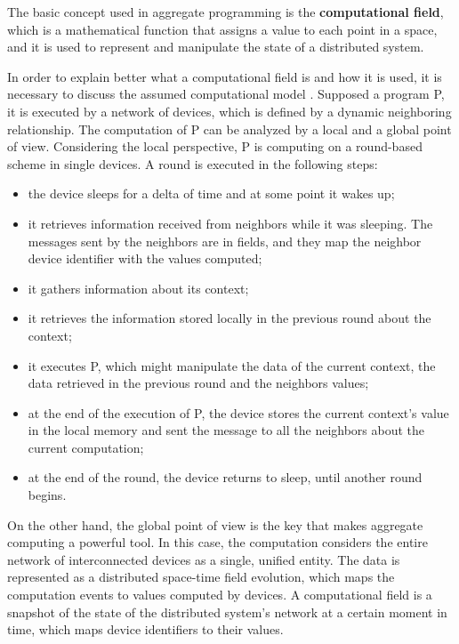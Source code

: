 The basic concept used in aggregate programming is the \textbf{computational field}, which is a mathematical function that assigns a value to each point in a space, and it is used to represent and manipulate the state of a distributed system.

In order to explain better what a computational field is and how it is used, it is necessary to discuss the assumed computational model \cite{computational_fields_theory}.\newline
Supposed a program P, it is executed by a network of devices, which is defined by a dynamic neighboring relationship. The computation of P can be analyzed by a local and a global point of view.\newline
Considering the local perspective, P is computing on a round-based scheme in single devices. A round is executed in the following steps:
\begin{itemize}
    \item the device sleeps for a delta of time and at some point it wakes up;
    \item it retrieves information received from neighbors while it was sleeping. The messages sent by the neighbors are in fields, and they map the neighbor device identifier with the values computed;
    \item it gathers information about its context;
    \item it retrieves the information stored locally in the previous round about the context;
    \item it executes P, which might manipulate the data of the current context, the data retrieved in the previous round and the neighbors values;
    \item at the end of the execution of P, the device stores the current context's value in the local memory and sent the message to all the neighbors about the current computation;
    \item at the end of the round, the device returns to sleep, until another round begins.
\end{itemize}

On the other hand, the global point of view is the key that makes aggregate computing a powerful tool. In this case, the computation considers the entire network of interconnected devices as a single, unified entity.\newline
The data is represented as a distributed space-time field evolution, which maps the computation events to values computed by devices.\newline
A computational field is a snapshot of the state of the distributed system's network at a certain moment in time, which maps device identifiers to their values.

